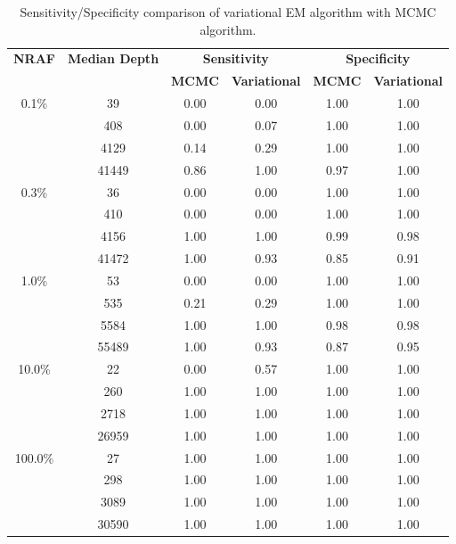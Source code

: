 \documentclass{bmcart}
\begin{document}
\begin{table}[h!]
\caption{Sensitivity/Specificity comparison of variational EM algorithm with MCMC algorithm.}\label{table:mcmcvar}
\scriptsize 
\begin{tabular}{c c c c c c }
\hline
\toprule
	{\bfseries NRAF} & {\bfseries Median Depth} & \multicolumn{2}{c}{{{\bfseries Sensitivity}}} &  \multicolumn{2}{c}{\bfseries Specificity} \\
	\cmidrule(r{4pt}){3-4} \cmidrule(l){5-6}
	 ~ & ~ & {\bfseries MCMC} & {\bfseries Variational} & {\bfseries MCMC} & {\bfseries Variational}   \\
	\midrule
	0.1\% & 39 & 0.00 & 0.00 & 1.00 & 1.00   \\
	 & 408 & 0.00 & 0.07 & 1.00 & 1.00   \\
	 & 4129 & 0.14 & 0.29 & 1.00 & 1.00   \\
	 & 41449 & 0.86 & 1.00 & 0.97 & 1.00   \\
	 \midrule
	0.3\% & 36 & 0.00 & 0.00 & 1.00 & 1.00   \\
	 & 410 & 0.00 & 0.00 & 1.00 & 1.00   \\
	 & 4156 & 1.00 & 1.00 & 0.99 & 0.98   \\
	 & 41472 & 1.00 & 0.93 & 0.85 & 0.91   \\
	 \midrule
	1.0\% & 53 & 0.00 & 0.00 & 1.00 & 1.00   \\
	 & 535 & 0.21 & 0.29 & 1.00 & 1.00  \\
	 & 5584 & 1.00 & 1.00 & 0.98 & 0.98   \\
	 & 55489 & 1.00 & 0.93 & 0.87 & 0.95   \\
	 \midrule
	10.0\% & 22 & 0.00 & 0.57 & 1.00 & 1.00   \\
	 & 260 & 1.00 & 1.00 & 1.00 & 1.00   \\
	 & 2718 & 1.00 & 1.00 & 1.00 & 1.00   \\
	 & 26959 & 1.00 & 1.00 & 1.00 & 1.00   \\
	 \midrule
	100.0\% & 27 & 1.00 & 1.00 & 1.00 & 1.00   \\
	 & 298 & 1.00 & 1.00 & 1.00 & 1.00   \\
	 & 3089 & 1.00 & 1.00 & 1.00 & 1.00   \\
	 & 30590 & 1.00 & 1.00 & 1.00 & 1.00   \\
	\bottomrule
\end{tabular}
\end{table}
\end{document}
